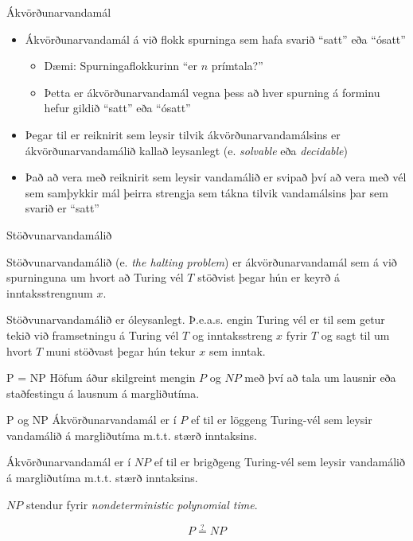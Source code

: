 \documentclass{beamer}
\begin{document}
\begin{frame}{Ákvörðunarvandamál}
\begin{itemize}
 \item Ákvörðunarvandamál á við flokk spurninga sem hafa svarið ``satt'' eða ``ósatt''
 \begin{itemize}
  \item Dæmi: Spurningaflokkurinn ``er $n$ prímtala?''
  \item Þetta er ákvörðunarvandamál vegna þess að hver spurning á forminu hefur gildið ``satt'' eða ``ósatt''
 \end{itemize}
 \item Þegar til er reiknirit sem leysir tilvik ákvörðunarvandamálsins er ákvörðunarvandamálið kallað leysanlegt (e. \emph{solvable} eða \emph{decidable})
 \item Það að vera með reiknirit sem leysir vandamálið er svipað því að vera með vél sem samþykkir mál þeirra strengja sem tákna tilvik vandamálsins þar sem svarið er ``satt''
\end{itemize}
\end{frame}

\begin{frame}{Stöðvunarvandamálið}
\begin{tcolorbox}[title=Stöðvunarvandamálið]
Stöðvunarvandamálið (e. \emph{the halting problem}) er ákvörðunarvandamál sem á við spurninguna um hvort að Turing vél $T$ stöðvist þegar hún er keyrð á inntaksstrengnum $x$.
\end{tcolorbox}

\begin{tcolorbox}[title=Óleysanleiki stöðvunarvandamálsins]
Stöðvunarvandamálið er óleysanlegt. Þ.e.a.s. engin Turing vél er til sem getur tekið við framsetningu á Turing vél $T$ og inntaksstreng $x$ fyrir $T$ og sagt til um hvort $T$ muni stöðvast þegar hún tekur $x$ sem inntak.
\end{tcolorbox}
\end{frame}

\begin{frame}{P = NP}
Höfum áður skilgreint mengin $P$ og $NP$ með því að tala um lausnir eða staðfestingu á lausnum á margliðutíma.
\begin{tcolorbox}{P og NP}
Ákvörðunarvandamál er í $P$ ef til er löggeng Turing-vél sem leysir vandamálið á margliðutíma m.t.t. stærð inntaksins.

Ákvörðunarvandamál er í $NP$ ef til er brigðgeng Turing-vél sem leysir vandamálið á margliðutíma m.t.t. stærð inntaksins.
\end{tcolorbox}
$NP$ stendur fyrir \emph{nondeterministic polynomial time}.
\end{frame}

\begin{frame}
\huge
\[
 P \overset{?}{=} NP
\]

\end{frame}
\end{document}
